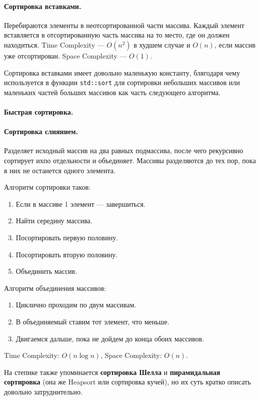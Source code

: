 \documentclass[14pt, a4paper]{extarticle}
\begin{document}
\paragraph{Сортировка вставками.} 
Перебираются элементы в неотсортированной части массива.
Каждый элемент вставляется в отсортированную часть массива на то место, где он должен находиться.
Time Complexity --- $O(n^2)$ в худшем случае и $O(n)$, если массив уже отсортирован. Space Complexity --- $O(1)$.

{\small
Сортировка вставками имеет довольно маленькую константу, блягодаря чему используется в функции \verb|std::sort|
для сортировки небольших массивов или маленьких частей больших массивов как часть следующего алгоритма.
}
\paragraph{Быстрая сортировка.} 

\paragraph{Сортировка слиянием.}
Разделяет исходный массив на два равных подмассива, после чего рекурсивно сортирует ихпо отдельности и объединяет.
Массивы разделяются до тех пор, пока в них не останется одного элемента.

Алгоритм сортировки таков:
\begin{enumerate}
  \item Если в массиве 1 элемент --- завершиться.
  \item Найти середину массива.
  \item Посортировать первую половину.
  \item Посортировать вторую половину.
  \item Объединить массив.
\end{enumerate}

Алгоритм объединения массивов:
\begin{enumerate}
  \item Циклично проходим по двум массивам.
  \item В объединяемый ставим тот элемент, что меньше.
  \item Двигаемся дальше, пока не дойдем до конца обоих массивов.
\end{enumerate}

Time Complexity: $O(n\log n)$, Space Complexity: $O(n)$.


{\small На степике также упоминается \textbf{сортировка Шелла} и \textbf{пирамидальная сортировка}
(она же Heapsort или сортировка кучей), но их суть кратко описать довольно затруднительно.}
\end{document}
